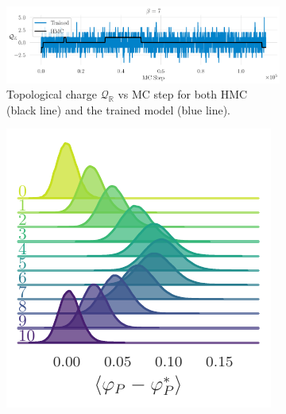 \documentclass{article} %
\begin{document}
\begin{figure}[htpb]
\begin{subfigure}{0.65\textwidth}
   \end{subfigure}
   \hfill
   \begin{subfigure}{\textwidth}
      \includegraphics[width=\textwidth]{figures/topological_freezing_anl_blue_wide.pdf}
      \caption{\label{fig:topological_freezing}Topological charge \(\mathcal{Q}_{\mathbb{R}}\) vs MC
      step for both HMC (black line) and the trained model (blue line).}%
   \end{subfigure}
   \hfill
   \begin{subfigure}{0.49\textwidth}
      \includegraphics[width=\textwidth]{figures/plaqsf_1758.pdf}

\end{subfigure}
\end{figure}
\end{document}
